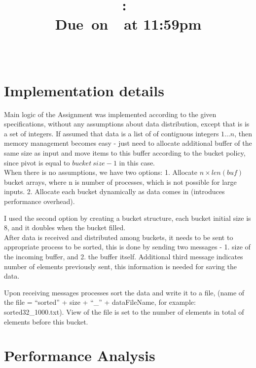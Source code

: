 \documentclass{article}
\title{
    \vspace{2in}
    \textmd{\textbf{\hmwkClass:\ \hmwkTitle}}\\
        \normalsize\vspace{0.1in}\small{Due\ on\ \hmwkDueDate\ at 11:59pm}\\
        \vspace{0.1in}\large{\textit{\hmwkClassInstructor\ \hmwkClassTime}}
    \vspace{3in}
}
\author{\textbf{\hmwkAuthorName}}
\date{  }
\begin{document}
\maketitle

\pagebreak

\section{Implementation details}

Main logic of the Assignment was implemented according to the given specifications, without
any assumptions about data distribution, except that is is a set of integers. If assumed that
data is a  list of of contiguous integers $1\dots n$, then memory management becomes
easy - just need to allocate additional buffer of the same size as input and move items
to this buffer according to the bucket policy, since pivot is equal to $bucket\ size-1$ in this
case. \\

When there is no assumptions, we have two options: 1. Allocate $n\times len(buf)$ bucket
arrays, where n is number of processes, which is not possible for large inputs. 2. Allocate
each bucket dynamically as data comes in (introduces performance overhead). 

I used the second option by creating a bucket structure, each bucket initial size is $8$,
and it doubles when the bucket filled.\\

After data is received and distributed among buckets, it needs to be sent to appropriate
process to be sorted, this is done by sending two messages - 1. size of the incoming buffer,
and 2. the buffer itself. Additional third message indicates number of elements previously
sent, this information is needed for saving the data.

Upon receiving messages processes sort the data and write it to a file, (name of the file =
``sorted'' + size + ``\_'' + dataFileName, for example: sorted32\_1000.txt). View of the file
is set to the number of elements in total of elements before this bucket.\\


\section{Performance Analysis}
\end{document}
